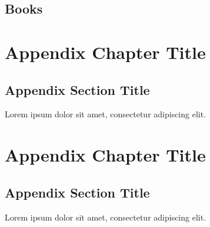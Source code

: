 \documentclass[
	11pt, %
	a4paper, %
]{LegrandOrangeBook}
\begin{document}
\printbibliography[heading=bibempty, type=article] %

\section*{Books}

\printbibliography[heading=bibempty, type=book] %


\cleardoublepage %
{} %
\printindex %


\chapterspaceabove{6.75cm} %
\chapterspacebelow{7.25cm} %

\begin{appendices}

\renewcommand{\chaptername}{Appendix} %


\chapter{Appendix Chapter Title}

\section{Appendix Section Title}

Lorem ipsum dolor sit amet, consectetur adipiscing elit.


\chapter{Appendix Chapter Title}

\section{Appendix Section Title}

Lorem ipsum dolor sit amet, consectetur adipiscing elit.


\end{appendices}

\end{document}

